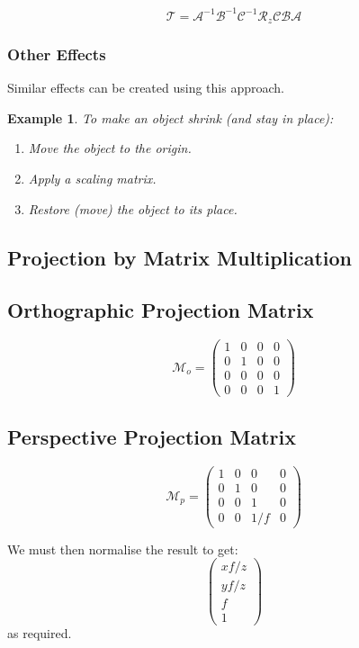 \documentclass[11pt]{article}
\newtheorem{eg}{Example}
\begin{document}
\[
  \mathcal{T} = \mathcal{A}^{-1} \mathcal{B}^{-1} \mathcal{C}^{-1} \mathcal{R}_z \mathcal{CBA}  
\]

\subsubsection{Other Effects}
Similar effects can be created using this approach.
\begin{eg}
  To make an object shrink (and stay in place):
  \begin{enumerate}
    \item Move the object to the origin.
    \item Apply a scaling matrix.
    \item Restore (move) the object to its place.
  \end{enumerate}
\end{eg}

\subsection{Projection by Matrix Multiplication}
\subsection{Orthographic Projection Matrix}
\[
  \mathcal{M}_o =
  \begin{pmatrix}
    1 & 0 & 0 & 0 \\
    0 & 1 & 0 & 0 \\
    0 & 0 & 0 & 0 \\
    0 & 0 & 0 & 1
  \end{pmatrix}
\]

\subsection{Perspective Projection Matrix}
\[
  \mathcal{M}_p =
  \begin{pmatrix}
    1 & 0 & 0 & 0 \\
    0 & 1 & 0 & 0 \\
    0 & 0 & 1 & 0 \\
    0 & 0 & 1 / f & 0
  \end{pmatrix}
\]

We must then normalise the result to get:
\[
  \begin{pmatrix} xf/z \\ yf/z \\ f \\ 1 \end{pmatrix}  
\]
as required.
\end{document}
